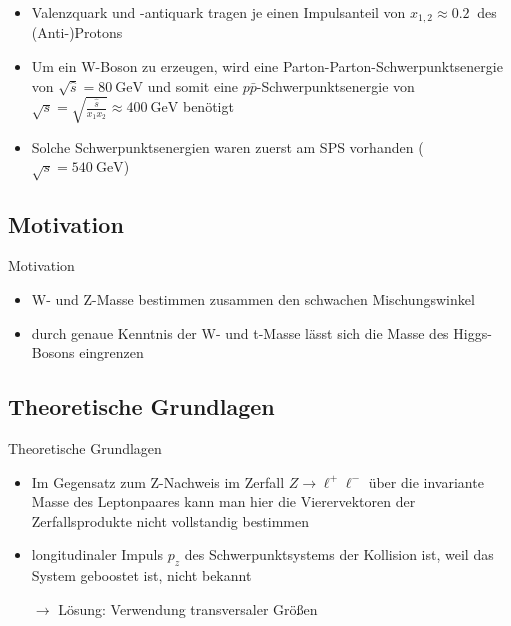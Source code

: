 \documentclass[aspectratio=1610, 9pt]{beamer}
\begin{document}
\begin{frame}
  \begin{itemize}
    \item Valenzquark und -antiquark tragen je einen Impulsanteil von $x_{1,2} \approx \SI{0,2}{}$ des (Anti-)Protons
    \item Um ein W-Boson zu erzeugen, wird eine Parton-Parton-Schwerpunktsenergie von $\sqrt{\hat{s}} = \SI{80}{\GeV}$ und somit eine $p \bar{p}$-Schwerpunktsenergie von $\sqrt{s} = \sqrt{\frac{\hat{s}}{x_1 x_2}} \approx \SI{400}{\GeV}$ benötigt
    \item Solche Schwerpunktsenergien waren zuerst am SPS vorhanden ($\sqrt{s} = \SI{540}{\GeV}$)
  \end{itemize}
\end{frame}

\subsection{Motivation}
\begin{frame}{Motivation}
  \begin{itemize}
    \item W- und Z-Masse bestimmen zusammen den schwachen Mischungswinkel
    \item durch genaue Kenntnis der W- und t-Masse lässt sich die Masse des Higgs-Bosons eingrenzen
  \end{itemize}
\end{frame}

\subsection{Theoretische Grundlagen}
\begin{frame}{Theoretische Grundlagen}
   \begin{itemize}
     \item Im Gegensatz zum Z-Nachweis im Zerfall $Z \rightarrow \ell^+ \ell^-$ über die invariante Masse des Leptonpaares kann man hier die Vierervektoren der Zerfallsprodukte nicht vollstandig bestimmen
     \item longitudinaler Impuls $p_z$ des Schwerpunktsystems der Kollision ist, weil das System geboostet ist, nicht bekannt \\
     \item[$\longrightarrow$] Lösung: Verwendung transversaler Größen
   \end{itemize}
\end{frame}
\end{document}
